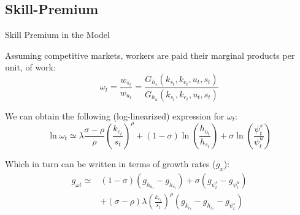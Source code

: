 \documentclass[notes,11pt, aspectratio=169]{beamer}
\newenvironment{wideitemize}{\itemize\addtolength{\itemsep}{10pt}}{\enditemize}
\begin{document}
\subsection{Skill-Premium}
\begin{frame}{Skill Premium in the Model}
    
    \begin{wideitemize}
    \item Assuming competitive markets, workers are paid their marginal products per unit, of work:
    \begin{equation*}
      \omega_t = \frac{w_{s_t}}{w_{u_t}} = \frac{G_{h_s}(k_{s_t}, k_{e_t}, u_t, s_t) }{G_{h_u}(k_{s_t}, k_{e_t}, u_t, s_t) }
    \end{equation*}
      \item We can obtain the following (log-linearized) expression for $\omega_t$:
      \begin{equation}\label{eq:skill_premium_log_linear}
        \ln \omega_{t} \simeq \lambda \frac{\sigma-\rho}{\rho}\left(\frac{k_{e_t}}{s_{t}}\right)^{\rho}+(1-\sigma) \ln \left(\frac{h_{u_t}}{h_{s_t}}\right)+\sigma \ln \left(\frac{\psi^s_t}{\psi^u_t}\right)
      \end{equation}
      \item Which in turn can be written in terms of growth rates ($g_x$):
      \begin{equation}\label{eq:skill_premium_growth_rates}
        \begin{aligned}
        g_{\omega t} \simeq &(1-\sigma)\left(g_{h_{u_t}}-g_{h_{s_t}}\right)+\sigma\left(g_{\psi^s_t}-g_{\psi^u_t}\right) \\
        &+(\sigma-\rho) \lambda\left(\frac{k_{e_t}}{s_{t}}\right)^{\rho}\left(g_{k_{e_t}}-g_{h_{s_t}}-g_{\psi^s_t}\right) 
        \end{aligned}
      \end{equation}
    \end{wideitemize}
\end{frame}
\end{document}
